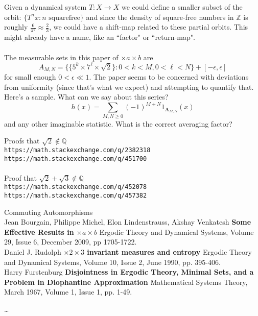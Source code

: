 \documentclass[12pt]{article}
\begin{document}
Given a dynamical system $T: X \to X$ we could define a smaller subset of the orbit: $\{ T^n x : n \text{ squarefree}\}$ and since the density of square-free numbers in $\mathbb{Z}$ is roughly $\frac{6}{\pi^2} \approx \frac{2}{3}$, we could have a shift-map related to these partial orbits.  This might already have a name, like an ``factor" or ``return-map". \\ \\ 
The measurable sets in this paper of $\times a \times b$ are 
$$ A_{M,N} = \Big\{ \{ 5^k \times 7^\ell  \times \sqrt{2} \} : 0 < k < M, 0 < \ell < N \Big\} + [-\epsilon, \epsilon] $$
for small enough $0 < \epsilon \ll 1$. The paper seems to be concerned with deviations from uniformity (since that's what we expect) and attempting to quantify that. Here's a sample.  What can we say about this series?
$$ h(x) = \sum_{M, N \geq 0} (-1)^{M+N} 1_{\mathbf{A}_{M,N}}(x) $$
and any other imaginable statistic. What is the correct averaging factor?
\vfill

\begin{thebibliography}{} 
\item Proofs that $\sqrt{2}\notin\mathbb{Q}$ \\
\texttt{https://math.stackexchange.com/q/2382318}\\
\texttt{https://math.stackexchange.com/q/451700} \\ \\ 
Proof that $\sqrt{2}+\sqrt{3} \notin \mathbb{Q}$ \\
\texttt{https://math.stackexchange.com/q/452078}\\ 
\texttt{https://math.stackexchange.com/q/457382}
\item Commuting Automorphisms \\
Jean Bourgain, Philippe Michel, Elon Lindenstrauss, Akshay Venkatesh \textbf{Some Effective Results in $\times a \times b$} Ergodic Theory and Dynamical Systems, Volume 29, Issue 6, December 2009, pp 1705-1722. \\
Daniel J. Rudolph \textbf{$\times 2 \times 3$ invariant measures and entropy} Ergodic Theory and Dynamical Systems, Volume 10, Issue 2, June 1990, pp. 395-406. \\ 
Harry Furstenburg \textbf{Disjointness in Ergodic Theory, Minimal Sets, and a Problem in Diophantine Approximation} Mathematical Systems Theory, March 1967, Volume 1, Issue 1, pp. 1-49.
\item \dots
\end{thebibliography}
\end{document}
